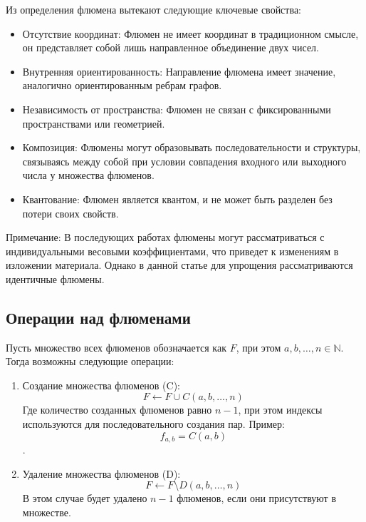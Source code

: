 \documentclass[final]{article}
\begin{document}
        Из определения флюмена вытекают следующие ключевые свойства:
        \begin{itemize}
            \item Отсутствие координат: Флюмен не имеет координат в традиционном 
            смысле, он представляет собой лишь направленное объединение двух 
            чисел.
            \item Внутренняя ориентированность: Направление флюмена имеет 
            значение, аналогично ориентированным ребрам графов.
            \item Независимость от пространства: Флюмен не связан с фиксированными
            пространствами или геометрией.
            \item Композиция: Флюмены могут образовывать последовательности и 
            структуры, связываясь между собой при условии совпадения входного 
            или выходного числа у множества флюменов.
            \item Квантование: Флюмен является квантом, и не может быть разделен 
            без потери своих свойств.
        \end{itemize}

        Примечание: В последующих работах флюмены могут рассматриваться с 
        индивидуальными весовыми коэффициентами, что приведет к изменениям в 
        изложении материала. Однако в данной статье для упрощения 
        рассматриваются идентичные флюмены.


    \subsection{Операции над флюменами}

        Пусть множество всех флюменов обозначается как \( F \), при этом \( a, b, \dots, 
        n \in \mathbb{N} \). Тогда возможны следующие операции:

        \begin{enumerate}

            \item Создание множества флюменов (C): \[ F \leftarrow F \cup C(a,b, 
            \dots, n) \] Где количество созданных флюменов равно \( n-1 \), при этом 
            индексы используются для последовательного создания пар. Пример: \[ 
            f_{a,b}=C(a,b) \].

            \item Удаление множества флюменов (D): \[ F \leftarrow F \setminus 
            D(a,b, \dots, n) \] В этом случае будет удалено \( n-1 \) флюменов, если 
            они присутствуют в множестве.

        \end{enumerate} 
\end{document}
